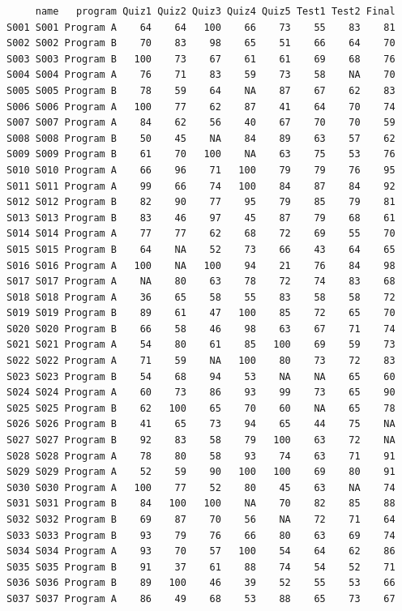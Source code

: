 \documentclass[
  letterpaper,
  DIV=11,
  numbers=noendperiod]{scrreprt}
\begin{document}
\begin{verbatim}
     name   program Quiz1 Quiz2 Quiz3 Quiz4 Quiz5 Test1 Test2 Final
S001 S001 Program A    64    64   100    66    73    55    83    81
S002 S002 Program B    70    83    98    65    51    66    64    70
S003 S003 Program B   100    73    67    61    61    69    68    76
S004 S004 Program A    76    71    83    59    73    58    NA    70
S005 S005 Program B    78    59    64    NA    87    67    62    83
S006 S006 Program A   100    77    62    87    41    64    70    74
S007 S007 Program A    84    62    56    40    67    70    70    59
S008 S008 Program B    50    45    NA    84    89    63    57    62
S009 S009 Program B    61    70   100    NA    63    75    53    76
S010 S010 Program A    66    96    71   100    79    79    76    95
S011 S011 Program A    99    66    74   100    84    87    84    92
S012 S012 Program B    82    90    77    95    79    85    79    81
S013 S013 Program B    83    46    97    45    87    79    68    61
S014 S014 Program A    77    77    62    68    72    69    55    70
S015 S015 Program B    64    NA    52    73    66    43    64    65
S016 S016 Program A   100    NA   100    94    21    76    84    98
S017 S017 Program A    NA    80    63    78    72    74    83    68
S018 S018 Program A    36    65    58    55    83    58    58    72
S019 S019 Program B    89    61    47   100    85    72    65    70
S020 S020 Program B    66    58    46    98    63    67    71    74
S021 S021 Program A    54    80    61    85   100    69    59    73
S022 S022 Program A    71    59    NA   100    80    73    72    83
S023 S023 Program B    54    68    94    53    NA    NA    65    60
S024 S024 Program A    60    73    86    93    99    73    65    90
S025 S025 Program B    62   100    65    70    60    NA    65    78
S026 S026 Program B    41    65    73    94    65    44    75    NA
S027 S027 Program B    92    83    58    79   100    63    72    NA
S028 S028 Program A    78    80    58    93    74    63    71    91
S029 S029 Program A    52    59    90   100   100    69    80    91
S030 S030 Program A   100    77    52    80    45    63    NA    74
S031 S031 Program B    84   100   100    NA    70    82    85    88
S032 S032 Program B    69    87    70    56    NA    72    71    64
S033 S033 Program B    93    79    76    66    80    63    69    74
S034 S034 Program A    93    70    57   100    54    64    62    86
S035 S035 Program B    91    37    61    88    74    54    52    71
S036 S036 Program B    89   100    46    39    52    55    53    66
S037 S037 Program A    86    49    68    53    88    65    73    67

\end{verbatim}
\end{document}
